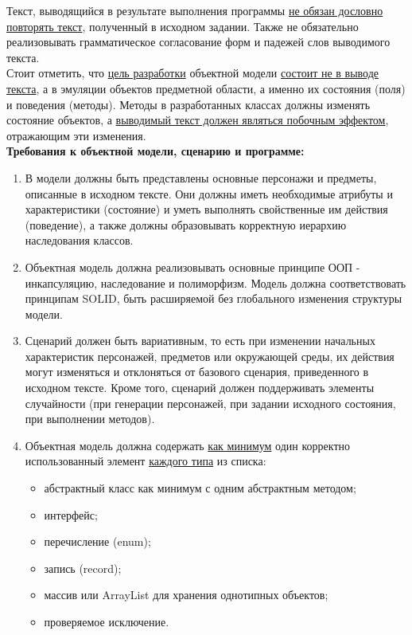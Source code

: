     Текст, выводящийся в результате выполнения программы \underline{не обязан дословно повторять текст}, полученный в исходном задании.
    Также не обязательно реализовывать грамматическое согласование форм и падежей слов выводимого текста.\\
    Стоит отметить, что \underline{цель разработки} объектной модели \underline{состоит не в выводе текста}, а в эмуляции объектов предметной области, а именно их состояния (поля) и поведения (методы).
    Методы в разработанных классах должны изменять состояние объектов, а \underline{выводимый текст должен являться побочным эффектом}, отражающим эти изменения.\\
    \textbf{Требования к объектной модели, сценарию и программе:}
    \begin{enumerate}
        \item В модели должны быть представлены основные персонажи и предметы, описанные в исходном тексте.
        Они должны иметь необходимые атрибуты и характеристики (состояние) и уметь выполнять свойственные им действия (поведение), а также должны образовывать корректную иерархию наследования классов.
        \item Объектная модель должна реализовывать основные принципе ООП - инкапсуляцию, наследование и полиморфизм.
        Модель должна соответствовать принципам SOLID, быть расширяемой без глобального изменения структуры модели.
        \item Сценарий должен быть вариативным, то есть при изменении начальных характеристик персонажей, предметов или окружающей среды, их действия могут изменяться и отклоняться от базового сценария, приведенного в исходном тексте.
        Кроме того, сценарий должен поддерживать элементы случайности (при генерации персонажей, при задании исходного состояния, при выполнении методов).
        \item Объектная модель должна содержать \underline{как минимум} один корректно использованный элемент \underline{каждого типа} из списка:
        \begin{itemize}
            \item абстрактный класс как минимум с одним абстрактным методом;
            \item интерфейс;
            \item перечисление (enum);
            \item запись (record);
            \item массив или ArrayList для хранения однотипных объектов;
            \item проверяемое исключение.

\end{itemize}
\end{enumerate}
